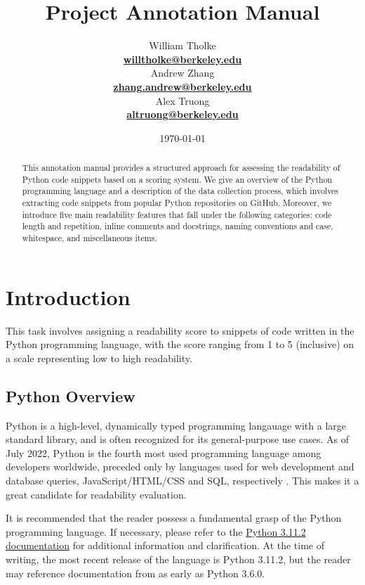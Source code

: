 \documentclass[11pt]{article}
\title{Project Annotation Manual}
\author{%
  \begin{minipage}[t]{0.3\textwidth}
    \centering
    William Tholke \\
    \href{mailto:willtholke@berkeley.edu}{\textbf{willtholke@berkeley.edu}}
  \end{minipage}%
  \hfill%
  \begin{minipage}[t]{0.3\textwidth}
    \centering
    Andrew Zhang \\
    \href{mailto:zhang.andrew@berkeley.edu}{\textbf{zhang.andrew@berkeley.edu}}
  \end{minipage}%
  \hfill%
  \begin{minipage}[t]{0.3\textwidth}
    \centering
    Alex Truong \\
    \href{mailto:altruong@berkeley.edu}{\textbf{altruong@berkeley.edu}}
  \end{minipage}%
}
\affil[]{School of Information, University of California, Berkeley\footnote{Affiliated with Info 159, Natural Langauge Processing, Spring 2023}}
\date{\today}
\begin{document}
\maketitle



\begin{abstract}

This annotation manual provides a structured approach for assessing the readability of Python code snippets based on a scoring system. We give an overview of the Python programming language and a description of the data collection process, which involves extracting code snippets from popular Python repositories on GitHub. Moreover, we introduce five main readability features that fall under the following categories: code length and repetition, inline comments and docstrings, naming conventions and case, whitespace, and miscellaneous items.

\end{abstract}

\vspace{1em}
\tableofcontents

\section{Introduction}

This task involves assigning a readability score to snippets of code written in the Python programming language, with the score ranging from 1 to 5 (inclusive) on a scale representing low to high readability.

\subsection{Python Overview}

Python is a high-level, dynamically typed programming langauage with a large standard library, and is often recognized for its general-purpose use cases. As of July 2022, Python is the fourth most used programming language among developers worldwide, preceded only by languages used for web development and database queries, JavaScript/HTML/CSS and SQL, respectively \cite{most_used_langs}. This makes it a great candidate for readability evaluation.

It is recommended that the reader possess a fundamental grasp of the Python programming language. If necessary, please refer to the \href{https://docs.python.org/3.11/}{\color{blue}Python 3.11.2 documentation} for additional information and clarification. %
At the time of writing, the most recent release of the language is Python 3.11.2, but the reader may reference documentation from as early as Python 3.6.0. 
\end{document}
